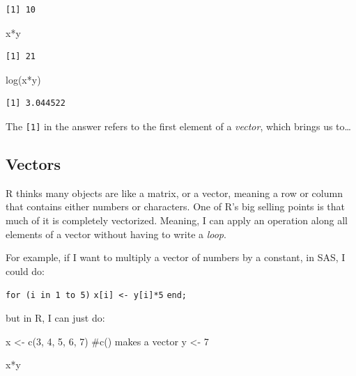 \documentclass[
  letterpaper,
  DIV=11,
  numbers=noendperiod]{scrreprt}
\newenvironment{Shaded}{\begin{snugshade}}{\end{snugshade}}
\newcommand{\CommentTok}[1]{\textcolor[rgb]{0.37,0.37,0.37}{#1}}
\newcommand{\DecValTok}[1]{\textcolor[rgb]{0.68,0.00,0.00}{#1}}
\newcommand{\FunctionTok}[1]{\textcolor[rgb]{0.28,0.35,0.67}{#1}}
\newcommand{\NormalTok}[1]{\textcolor[rgb]{0.00,0.23,0.31}{#1}}
\newcommand{\OtherTok}[1]{\textcolor[rgb]{0.00,0.23,0.31}{#1}}
\newcommand{\SpecialCharTok}[1]{\textcolor[rgb]{0.37,0.37,0.37}{#1}}
\begin{document}
\begin{verbatim}
[1] 10
\end{verbatim}

\begin{Shaded}
\begin{Highlighting}[]
\NormalTok{x}\SpecialCharTok{*}\NormalTok{y}
\end{Highlighting}
\end{Shaded}

\begin{verbatim}
[1] 21
\end{verbatim}

\begin{Shaded}
\begin{Highlighting}[]
\FunctionTok{log}\NormalTok{(x}\SpecialCharTok{*}\NormalTok{y)}
\end{Highlighting}
\end{Shaded}

\begin{verbatim}
[1] 3.044522
\end{verbatim}

The \texttt{{[}1{]}} in the answer refers to the first element of a
\emph{vector}, which brings us to\ldots{}

\hypertarget{vectors}{%
\subsection{Vectors}\label{vectors}}

R thinks many objects are like a matrix, or a vector, meaning a row or
column that contains either numbers or characters. One of R's big
selling points is that much of it is completely vectorized. Meaning, I
can apply an operation along all elements of a vector without having to
write a \emph{loop}.

For example, if I want to multiply a vector of numbers by a constant, in
SAS, I could do:

\texttt{for\ (i\ in\ 1\ to\ 5)}
\texttt{x{[}i{]}\ \textless{}-\ y{[}i{]}*5} \texttt{end;}

but in R, I can just do:

\begin{Shaded}
\begin{Highlighting}[]
\NormalTok{x }\OtherTok{\textless{}{-}} \FunctionTok{c}\NormalTok{(}\DecValTok{3}\NormalTok{, }\DecValTok{4}\NormalTok{, }\DecValTok{5}\NormalTok{, }\DecValTok{6}\NormalTok{, }\DecValTok{7}\NormalTok{)}
\CommentTok{\#c() makes a vector}
\NormalTok{y }\OtherTok{\textless{}{-}} \DecValTok{7}

\NormalTok{x}\SpecialCharTok{*}\NormalTok{y}
\end{Highlighting}
\end{Shaded}
\end{document}
